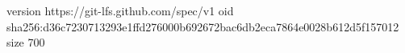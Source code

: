 version https://git-lfs.github.com/spec/v1
oid sha256:d36c7230713293e1ffd276000b692672bac6db2eca7864e0028b612d5f157012
size 700
